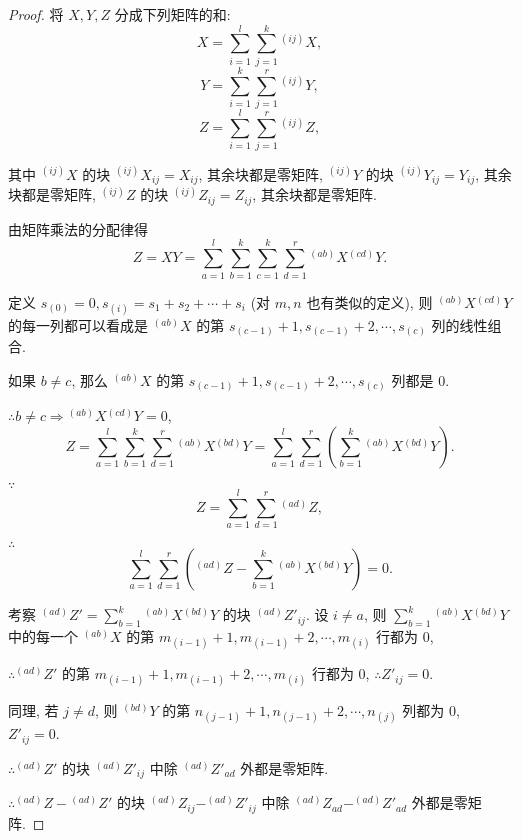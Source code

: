\documentclass{ctexart}
\begin{document}
\begin{proof}
    将 $X,Y,Z$ 分成下列矩阵的和:
    \[X=\sum\limits_{i=1}^{l}\sum\limits_{j=1}^{k}{}^{(ij)}X,\]
    \[Y=\sum\limits_{i=1}^{k}\sum\limits_{j=1}^{r}{}^{(ij)}Y,\]
    \[Z=\sum\limits_{i=1}^{l}\sum\limits_{j=1}^{r}{}^{(ij)}Z,\]

    其中 ${}^{(ij)}X$ 的块 ${}^{(ij)}X_{ij}=X_{ij}$, 其余块都是零矩阵, ${}^{(ij)}Y$ 的块 ${}^{(ij)}Y_{ij}=Y_{ij}$, 其余块都是零矩阵, ${}^{(ij)}Z$ 的块 ${}^{(ij)}Z_{ij}=Z_{ij}$, 其余块都是零矩阵.

    由矩阵乘法的分配律得
    \[Z=XY=\sum\limits_{a=1}^{l}\sum\limits_{b=1}^{k}\sum\limits_{c=1}^{k}\sum\limits_{d=1}^{r}{}^{(ab)}X{}^{(cd)}Y.\]

    定义 $s_{(0)}=0,s_{(i)}=s_1+s_2+\cdots+s_i$ (对 $m,n$ 也有类似的定义), 则 ${}^{(ab)}X{}^{(cd)}Y$ 的每一列都可以看成是 ${}^{(ab)}X$ 的第 $s_{(c-1)}+1,s_{(c-1)}+2,\cdots,s_{(c)}$ 列的线性组合.

    如果 $b\neq c$, 那么 ${}^{(ab)}X$ 的第 $s_{(c-1)}+1,s_{(c-1)}+2,\cdots,s_{(c)}$ 列都是 $0$.

    $\therefore b\neq c\Rightarrow{}^{(ab)}X{}^{(cd)}Y=0$,
    \[Z=\sum\limits_{a=1}^{l}\sum\limits_{b=1}^{k}\sum\limits_{d=1}^{r}{}^{(ab)}X{}^{(bd)}Y=\sum\limits_{a=1}^{l}\sum\limits_{d=1}^{r}\left(\sum\limits_{b=1}^{k}{}^{(ab)}X{}^{(bd)}Y\right).\]

    $\because$
    \[Z=\sum\limits_{a=1}^{l}\sum\limits_{d=1}^{r}{}^{(ad)}Z,\]

    $\therefore$
    \begin{equation}\label{eq2.5}
        \sum\limits_{a=1}^{l}\sum\limits_{d=1}^{r}\left({}^{(ad)}Z-\sum\limits_{b=1}^{k}{}^{(ab)}X{}^{(bd)}Y\right)=0.
    \end{equation}

    考察 $^{(ad)}Z'=\sum\limits_{b=1}^{k}{}^{(ab)}X{}^{(bd)}Y$ 的块 $^{(ad)}Z'_{ij}$. 设 $i\neq a$, 则 $\sum\limits_{b=1}^{k}{}^{(ab)}X{}^{(bd)}Y$ 中的每一个 $^{(ab)}X$ 的第 $m_{(i-1)}+1,m_{(i-1)}+2,\cdots,m_{(i)}$ 行都为 $0$,

    $\therefore{}^{(ad)}Z'$ 的第 $m_{(i-1)}+1,m_{(i-1)}+2,\cdots,m_{(i)}$ 行都为 $0$, $\therefore Z'_{ij}=0$.

    同理, 若 $j\neq d$, 则 $^{(bd)}Y$ 的第 $n_{(j-1)}+1,n_{(j-1)}+2,\cdots,n_{(j)}$ 列都为 $0$, $Z'_{ij}=0$.

    $\therefore{}^{(ad)}Z'$ 的块 $^{(ad)}Z'_{ij}$ 中除 $^{(ad)}Z'_{ad}$ 外都是零矩阵.

    $\therefore{}^{(ad)}Z-{}^{(ad)}Z'$ 的块 $^{(ad)}Z_{ij}-^{(ad)}Z'_{ij}$ 中除 $^{(ad)}Z_{ad}-^{(ad)}Z'_{ad}$ 外都是零矩阵.


\end{proof}
\end{document}
